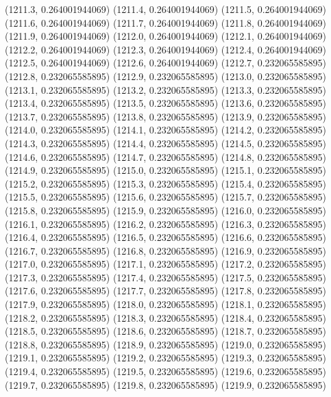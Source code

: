{					(1211.3, 0.264001944069)
					(1211.4, 0.264001944069)
					(1211.5, 0.264001944069)
					(1211.6, 0.264001944069)
					(1211.7, 0.264001944069)
					(1211.8, 0.264001944069)
					(1211.9, 0.264001944069)
					(1212.0, 0.264001944069)
					(1212.1, 0.264001944069)
					(1212.2, 0.264001944069)
					(1212.3, 0.264001944069)
					(1212.4, 0.264001944069)
					(1212.5, 0.264001944069)
					(1212.6, 0.264001944069)
					(1212.7, 0.232065585895)
					(1212.8, 0.232065585895)
					(1212.9, 0.232065585895)
					(1213.0, 0.232065585895)
					(1213.1, 0.232065585895)
					(1213.2, 0.232065585895)
					(1213.3, 0.232065585895)
					(1213.4, 0.232065585895)
					(1213.5, 0.232065585895)
					(1213.6, 0.232065585895)
					(1213.7, 0.232065585895)
					(1213.8, 0.232065585895)
					(1213.9, 0.232065585895)
					(1214.0, 0.232065585895)
					(1214.1, 0.232065585895)
					(1214.2, 0.232065585895)
					(1214.3, 0.232065585895)
					(1214.4, 0.232065585895)
					(1214.5, 0.232065585895)
					(1214.6, 0.232065585895)
					(1214.7, 0.232065585895)
					(1214.8, 0.232065585895)
					(1214.9, 0.232065585895)
					(1215.0, 0.232065585895)
					(1215.1, 0.232065585895)
					(1215.2, 0.232065585895)
					(1215.3, 0.232065585895)
					(1215.4, 0.232065585895)
					(1215.5, 0.232065585895)
					(1215.6, 0.232065585895)
					(1215.7, 0.232065585895)
					(1215.8, 0.232065585895)
					(1215.9, 0.232065585895)
					(1216.0, 0.232065585895)
					(1216.1, 0.232065585895)
					(1216.2, 0.232065585895)
					(1216.3, 0.232065585895)
					(1216.4, 0.232065585895)
					(1216.5, 0.232065585895)
					(1216.6, 0.232065585895)
					(1216.7, 0.232065585895)
					(1216.8, 0.232065585895)
					(1216.9, 0.232065585895)
					(1217.0, 0.232065585895)
					(1217.1, 0.232065585895)
					(1217.2, 0.232065585895)
					(1217.3, 0.232065585895)
					(1217.4, 0.232065585895)
					(1217.5, 0.232065585895)
					(1217.6, 0.232065585895)
					(1217.7, 0.232065585895)
					(1217.8, 0.232065585895)
					(1217.9, 0.232065585895)
					(1218.0, 0.232065585895)
					(1218.1, 0.232065585895)
					(1218.2, 0.232065585895)
					(1218.3, 0.232065585895)
					(1218.4, 0.232065585895)
					(1218.5, 0.232065585895)
					(1218.6, 0.232065585895)
					(1218.7, 0.232065585895)
					(1218.8, 0.232065585895)
					(1218.9, 0.232065585895)
					(1219.0, 0.232065585895)
					(1219.1, 0.232065585895)
					(1219.2, 0.232065585895)
					(1219.3, 0.232065585895)
					(1219.4, 0.232065585895)
					(1219.5, 0.232065585895)
					(1219.6, 0.232065585895)
					(1219.7, 0.232065585895)
					(1219.8, 0.232065585895)
					(1219.9, 0.232065585895)
}
